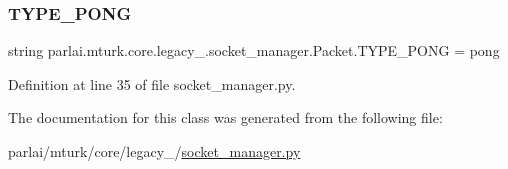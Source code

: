 \subsubsection{\texorpdfstring{T\+Y\+P\+E\+\_\+\+P\+O\+NG}{TYPE\_PONG}}
{\footnotesize\ttfamily string parlai.\+mturk.\+core.\+legacy\+\_.\+socket\+\_\+manager.\+Packet.\+T\+Y\+P\+E\+\_\+\+P\+O\+NG = \textquotesingle{}pong\textquotesingle{}\hspace{0.3cm}{\ttfamily [static]}}



Definition at line 35 of file socket\+\_\+manager.\+py.



The documentation for this class was generated from the following file\+:\begin{DoxyCompactItemize}
\item 
parlai/mturk/core/legacy\+\_/\hyperlink{legacy__2018_2socket__manager_8py}{socket\+\_\+manager.\+py}\end{DoxyCompactItemize}
